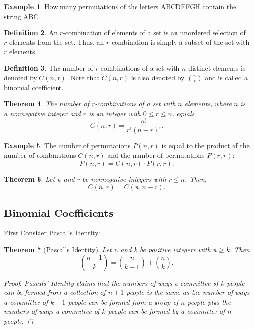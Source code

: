 \documentclass[letterpaper,10pt]{article}
\theoremstyle{plain}
\newtheorem{thm}{Theorem}[section]
\theoremstyle{definition}
\newtheorem{defn}[thm]{Definition}
\newtheorem{exmp}[thm]{Example}
\theoremstyle{remark}
\begin{document}
\begin{exmp}

How many permutations of the letters ABCDEFGH contain the string ABC.
\vspace{3cm}
\end{exmp}
\begin{defn}
    An $r$-combination of elements of a set is an unordered selection of $r$ elements from the set. Thus, an $r$-combination is simply a subset of the set with $r$ elements.
\end{defn}
\begin{defn}
    The number of $r$-combinations of a set with $n$ distinct elements is denoted by $C(n, r)$. Note that $C(n, r)$ is also denoted by $\binom{n}{r}$ and is called a binomial coefficient.
\end{defn}
\begin{thm}
    The number of $r$-combinations of a set with $n$ elements, where $n$ is a nonnegative integer and $r$ is an integer with $0 \leq r \leq n$, equals
    \[
    C(n, r) = \frac{n!}{r! (n - r)!}.
    \]
\end{thm}
\begin{exmp}
    The number of permutations $P(n, r)$ is equal to the product of the number of combinations $C(n, r)$ and the number of permutations $P(r, r)$:
    \[
    P(n, r) = C(n, r) \cdot P(r, r).
    \]
    \vspace{3cm}
\end{exmp}
\begin{thm}

    Let $n$ and $r$ be nonnegative integers with $r \leq n$. Then, 
    \[
    C(n, r) = C(n, n - r).
    \]
    \vspace{3cm}
\end{thm}
\subsection{Binomial Coefficients}

First Consider Pascal's Identity:
\begin{thm}[Pascal's Identity]
    Let \(n\) and \(k\) be positive integers with \(n \geq k\). Then
    \[
    \binom{n+1}{k} = \binom{n}{k-1} + \binom{n}{k}.
    \]
\begin{proof}
Pascals' Identity claims that the numbers of ways a committee of $k$ people can be formed from a collection of $n+1$ people is the same as the number of ways a committee of $k-1$ people can be formed from a group of $n$ people plus the numbers of ways a committee of $k$ people can be formed by a committee of $n$ people.
\end{proof}
\end{thm}
\end{document}
